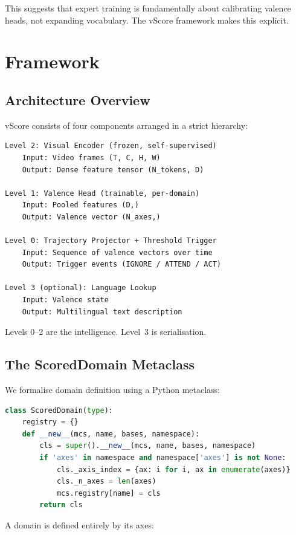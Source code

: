 \documentclass[11pt]{article}
\begin{document}
This suggests that expert training is fundamentally about calibrating valence heads, not expanding vocabulary. The vScore framework makes this explicit.

\section{Framework}

\subsection{Architecture Overview}

vScore consists of four components arranged in a strict hierarchy:

\begin{lstlisting}[language={}]
Level 2: Visual Encoder (frozen, self-supervised)
    Input: Video frames (T, C, H, W)
    Output: Dense feature tensor (N_tokens, D)

Level 1: Valence Head (trainable, per-domain)
    Input: Pooled features (D,)
    Output: Valence vector (N_axes,)

Level 0: Trajectory Projector + Threshold Trigger
    Input: Sequence of valence vectors over time
    Output: Trigger events (IGNORE / ATTEND / ACT)

Level 3 (optional): Language Lookup
    Input: Valence state
    Output: Multilingual text description
\end{lstlisting}

Levels 0--2 are the intelligence. Level~3 is serialisation.

\subsection{The ScoredDomain Metaclass}

We formalise domain definition using a Python metaclass:

\begin{lstlisting}[language=Python]
class ScoredDomain(type):
    registry = {}
    def __new__(mcs, name, bases, namespace):
        cls = super().__new__(mcs, name, bases, namespace)
        if 'axes' in namespace and namespace['axes'] is not None:
            cls._axis_index = {ax: i for i, ax in enumerate(axes)}
            cls._n_axes = len(axes)
            mcs.registry[name] = cls
        return cls
\end{lstlisting}

A domain is defined entirely by its axes:
\end{document}
